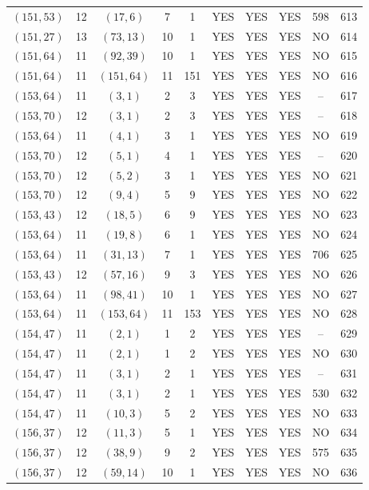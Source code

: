 \begin{longtable}{|c|c|c|c|c|c|c|c|c|c|}
$(151, 53)$ & 12 & $(17, 6)$ & 7 & 1 & YES & YES & YES & 598 & 613\\
$(151, 27)$ & 13 & $(73, 13)$ & 10 & 1 & YES & YES & YES & NO & 614\\
$(151, 64)$ & 11 & $(92, 39)$ & 10 & 1 & YES & YES & YES & NO & 615\\
$(151, 64)$ & 11 & $(151, 64)$ & 11 & 151 & YES & YES & YES & NO & 616\\
$(153, 64)$ & 11 & $(3, 1)$ & 2 & 3 & YES & YES & YES & -- & 617\\
$(153, 70)$ & 12 & $(3, 1)$ & 2 & 3 & YES & YES & YES & -- & 618\\
$(153, 64)$ & 11 & $(4, 1)$ & 3 & 1 & YES & YES & YES & NO & 619\\
$(153, 70)$ & 12 & $(5, 1)$ & 4 & 1 & YES & YES & YES & -- & 620\\
$(153, 70)$ & 12 & $(5, 2)$ & 3 & 1 & YES & YES & YES & NO & 621\\
$(153, 70)$ & 12 & $(9, 4)$ & 5 & 9 & YES & YES & YES & NO & 622\\
$(153, 43)$ & 12 & $(18, 5)$ & 6 & 9 & YES & YES & YES & NO & 623\\
$(153, 64)$ & 11 & $(19, 8)$ & 6 & 1 & YES & YES & YES & NO & 624\\
$(153, 64)$ & 11 & $(31, 13)$ & 7 & 1 & YES & YES & YES & 706 & 625\\
$(153, 43)$ & 12 & $(57, 16)$ & 9 & 3 & YES & YES & YES & NO & 626\\
$(153, 64)$ & 11 & $(98, 41)$ & 10 & 1 & YES & YES & YES & NO & 627\\
$(153, 64)$ & 11 & $(153, 64)$ & 11 & 153 & YES & YES & YES & NO & 628\\
$(154, 47)$ & 11 & $(2, 1)$ & 1 & 2 & YES & YES & YES & -- & 629\\
$(154, 47)$ & 11 & $(2, 1)$ & 1 & 2 & YES & YES & YES & NO & 630\\
$(154, 47)$ & 11 & $(3, 1)$ & 2 & 1 & YES & YES & YES & -- & 631\\
$(154, 47)$ & 11 & $(3, 1)$ & 2 & 1 & YES & YES & YES & 530 & 632\\
$(154, 47)$ & 11 & $(10, 3)$ & 5 & 2 & YES & YES & YES & NO & 633\\
$(156, 37)$ & 12 & $(11, 3)$ & 5 & 1 & YES & YES & YES & NO & 634\\
$(156, 37)$ & 12 & $(38, 9)$ & 9 & 2 & YES & YES & YES & 575 & 635\\
$(156, 37)$ & 12 & $(59, 14)$ & 10 & 1 & YES & YES & YES & NO & 636\\

\end{longtable}
